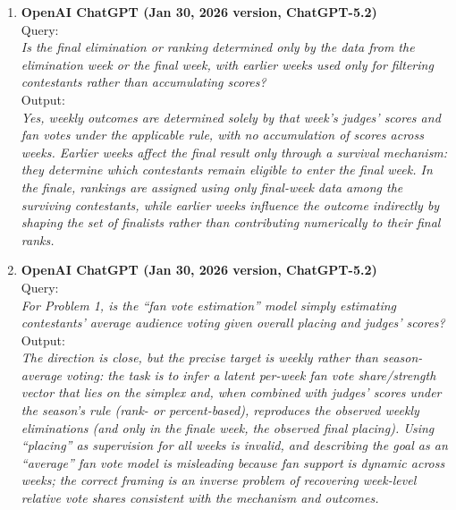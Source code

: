 \documentclass[12pt]{article}
\begin{document}
\begin{enumerate}
	\item \textbf{OpenAI ChatGPT (Jan 30, 2026 version, ChatGPT-5.2)}\\
	Query: \\
	\textit{Is the final elimination or ranking determined only by the data from the elimination week or the final week, with earlier weeks used only for filtering contestants rather than accumulating scores?}\\
	Output: \\
	\textit{Yes, weekly outcomes are determined solely by that week’s judges’ scores and fan votes under the applicable rule, with no accumulation of scores across weeks. Earlier weeks affect the final result only through a survival mechanism: they determine which contestants remain eligible to enter the final week. In the finale, rankings are assigned using only final-week data among the surviving contestants, while earlier weeks influence the outcome indirectly by shaping the set of finalists rather than contributing numerically to their final ranks.}
	
	\item \textbf{OpenAI ChatGPT (Jan 30, 2026 version, ChatGPT-5.2)}\\
	Query: \\
	\textit{For Problem 1, is the ``fan vote estimation'' model simply estimating contestants' average audience voting given overall placing and judges' scores?}\\
	Output: \\
	\textit{The direction is close, but the precise target is weekly rather than season-average voting: the task is to infer a latent per-week fan vote share/strength vector that lies on the simplex and, when combined with judges' scores under the season's rule (rank- or percent-based), reproduces the observed weekly eliminations (and only in the finale week, the observed final placing). Using ``placing'' as supervision for all weeks is invalid, and describing the goal as an ``average'' fan vote model is misleading because fan support is dynamic across weeks; the correct framing is an inverse problem of recovering week-level relative vote shares consistent with the mechanism and outcomes.}
	

\end{enumerate}
\end{document}
